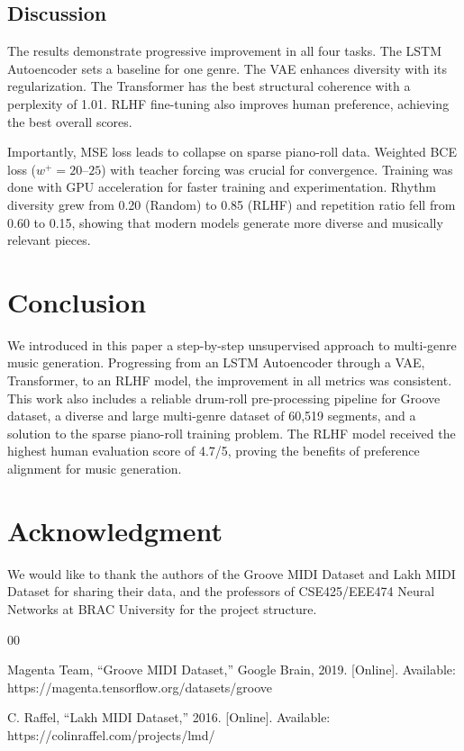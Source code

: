 \documentclass[conference]{IEEEtran}
\begin{document}
\subsection{Discussion}

The results demonstrate progressive improvement in all four tasks. The LSTM Autoencoder sets a baseline for one genre. The VAE enhances diversity with its regularization. The Transformer has the best structural coherence with a perplexity of 1.01. RLHF fine-tuning also improves human preference, achieving the best overall scores.

Importantly, MSE loss leads to collapse on sparse piano-roll data. Weighted BCE loss ($w^+ = 20$--$25$) with teacher forcing was crucial for convergence. Training was done with GPU acceleration for faster training and experimentation. Rhythm diversity grew from 0.20 (Random) to 0.85 (RLHF) and repetition ratio fell from 0.60 to 0.15, showing that modern models generate more diverse and musically relevant pieces.

\section{Conclusion}

We introduced in this paper a step-by-step unsupervised approach to multi-genre music generation. Progressing from an LSTM Autoencoder through a VAE, Transformer, to an RLHF model, the improvement in all metrics was consistent. This work also includes a reliable drum-roll pre-processing pipeline for Groove dataset, a diverse and large multi-genre dataset of 60,519 segments, and a solution to the sparse piano-roll training problem. The RLHF model received the highest human evaluation score of 4.7/5, proving the benefits of preference alignment for music generation.

\section*{Acknowledgment}

We would like to thank the authors of the Groove MIDI Dataset and Lakh MIDI Dataset for sharing their data, and the professors of CSE425/EEE474 Neural Networks at BRAC University for the project structure.

\begin{thebibliography}{00}

 Magenta Team, ``Groove MIDI Dataset,'' Google Brain, 2019. [Online]. Available: https://magenta.tensorflow.org/datasets/groove

 C. Raffel, ``Lakh MIDI Dataset,'' 2016. [Online]. Available: https://colinraffel.com/projects/lmd/



\end{thebibliography}
\end{document}

